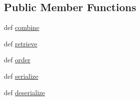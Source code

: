 \subsection*{Public Member Functions}
\begin{DoxyCompactItemize}
\item 
def \hyperlink{classcheshire3_1_1base_objects_1_1_result_set_a1f1543e1a2a20b45a544b2fb4f45e50c}{combine}
\item 
def \hyperlink{classcheshire3_1_1base_objects_1_1_result_set_af4bd5bf4b730c4f5de798f651dc1fc26}{retrieve}
\item 
def \hyperlink{classcheshire3_1_1base_objects_1_1_result_set_a968951756b7978ae6002cdcb824b38e6}{order}
\item 
def \hyperlink{classcheshire3_1_1base_objects_1_1_result_set_a6469fbd23b7f794342e1991dfcb10bc2}{serialize}
\item 
def \hyperlink{classcheshire3_1_1base_objects_1_1_result_set_a2d0785135c37be2dba5872c07c5ebf16}{deserialize}
\end{DoxyCompactItemize}
